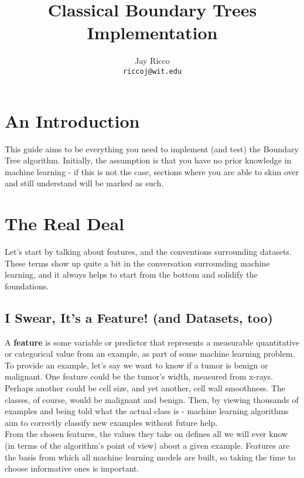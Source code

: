 \documentclass[12pt,letterpaper]{article}
\title{Classical Boundary Trees Implementation}
\author{
	Jay Ricco\\
	\small \texttt{riccoj@wit.edu}
}
\begin{document}
	\maketitle
	\section{An Introduction}
		This guide aims to be everything you need to implement (and test) the Boundary Tree algorithm. Initially, the assumption is that you have no prior knowledge in machine learning - if this is not the case, sections where you are able to skim over and still understand will be marked as such.\\

	\section{The Real Deal}
			Let's start by talking about features, and the conventions surrounding datasets. These terms show up quite a bit in the conversation surrounding machine learning, and it always helps to start from the bottom and solidify the foundations.\\
		\subsection{I Swear, It's a Feature! (and Datasets, too)}
			
			A \textbf{feature} is some variable or predictor that represents a measurable quantitative or categorical value from an example, as part of some machine learning problem.\\
			To provide an example, let's say we want to know if a tumor is benign or malignant. One feature could be the tumor's width, measured from x-rays. Perhaps another could be cell size, and yet another, cell wall smoothness. The classes, of course, would be malignant and benign. Then, by viewing thousands of examples and being told what the actual class is - machine learning algorithms aim to correctly classify new examples without future help.\\
			
			From the chosen features, the values they take on defines all we will ever know (in terms of the algorithm's point of view) about a given example. Features are the basis from which all machine learning models are built, so taking the time to choose informative ones is important.\\ 
			
\end{document}
